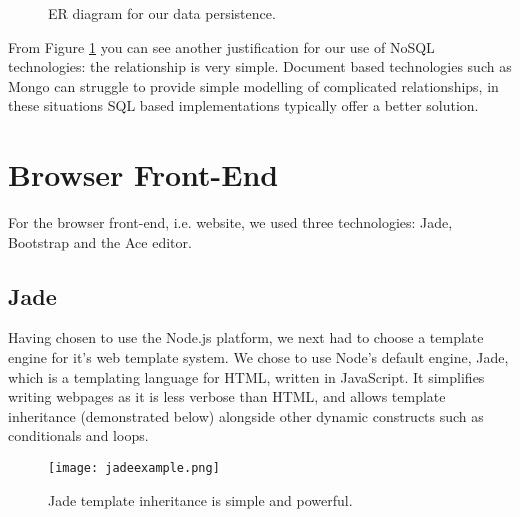 \begin{figure}[H]
\centering
{}
\caption{ER diagram for our data persistence.}
\label{fig:ER}
\end{figure}

From Figure \ref{fig:ER} you can see another justification for our use of NoSQL technologies: the relationship is very simple. Document based technologies such as Mongo can struggle to provide simple modelling of complicated relationships, in these situations SQL based implementations typically offer a better solution. 

\section{Browser Front-End}

For the browser front-end, i.e. website, we used three technologies: Jade, Bootstrap and the Ace editor.

\subsection{Jade}
Having chosen to use the Node.js platform, we next had to choose a template engine for it's web template system. We chose to use Node's default engine, Jade\cite{jade}, which is a templating language for HTML, written in JavaScript. It simplifies writing webpages as it is less verbose than HTML, and allows template inheritance (demonstrated below) alongside other dynamic constructs such as conditionals and loops.
\vspace{-2mm}
\begin{figure}[H]
\centering
\texttt{[image: jadeexample.png]}
\caption{Jade template inheritance is simple and powerful.}
\end{figure}

